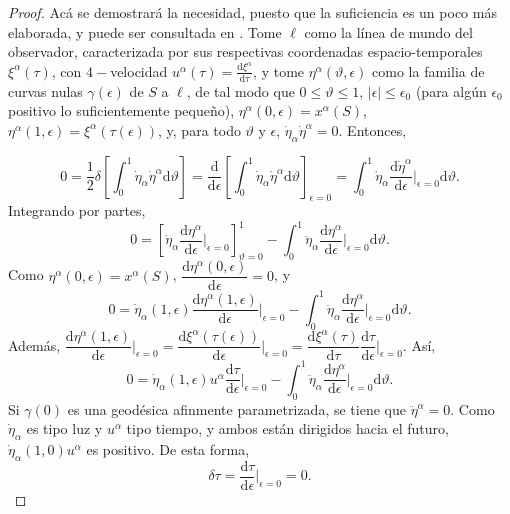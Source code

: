 \begin{proof}
Acá se demostrará la necesidad, puesto que la suficiencia es un poco más elaborada, y puede ser consultada en \cite{schneider_ehlers_falco_1992}. Tome $\ell$ como la línea de mundo del observador, caracterizada por sus respectivas coordenadas espacio-temporales $\xi^\alpha(\tau)$, con $4-$velocidad $u^\alpha(\tau)=\frac{\mathrm{d}\xi^\alpha}{\mathrm{d}\tau}$, y tome $\eta^\alpha(\vartheta,\epsilon)$ como la familia de curvas nulas $\gamma(\epsilon)$ de $S$ a $\ell$, de tal modo que $0\leq\vartheta\leq1$, $|\epsilon|\leq \epsilon_0$ (para algún $\epsilon_0$ positivo lo suficientemente pequeño), $\eta^\alpha(0,\epsilon)=x^\alpha(S)$, $\eta^\alpha(1,\epsilon)=\xi^\alpha(\tau(\epsilon))$, y, para todo $\vartheta$ y $\epsilon$, $\dot{\eta}_\alpha\dot{\eta}^\alpha=0$. Entonces,

$$0=\frac{1}{2}\delta\left[ \int_0^1 \dot{\eta}_\alpha\dot{\eta}^\alpha \mathrm{d}\vartheta  \right]=\frac{\mathrm{d}}{\mathrm{d}\epsilon}\left[ \int_0^1 \dot{\eta}_\alpha\dot{\eta}^\alpha \mathrm{d}\vartheta  \right]_{\epsilon=0}=\int_0^1 \dot{\eta}_\alpha \frac{\mathrm{d}\dot{\eta}^\alpha}{\mathrm{d}\epsilon}\Big|_{\epsilon=0}\mathrm{d}\vartheta.$$
Integrando por partes,
$$0=\left[ \dot{\eta}_\alpha\frac{\mathrm{d}\eta^\alpha}{\mathrm{d}\epsilon}\Big|_{\epsilon=0} \right]_{\vartheta=0}^1 -\int_0^1\ddot{\eta}_\alpha \frac{\mathrm{d}\eta^\alpha}{\mathrm{d}\epsilon}\Big|_{\epsilon=0}\mathrm{d}\vartheta.$$
Como $\eta^\alpha(0,\epsilon)=x^\alpha(S)$, $\dfrac{\mathrm{d}\eta^\alpha(0,\epsilon)}{\mathrm{d}\epsilon}=0$, y
$$0=\dot{\eta}_\alpha(1,\epsilon)\frac{\mathrm{d}\eta^\alpha(1,\epsilon)}{\mathrm{d}\epsilon}\Big|_{\epsilon=0}-\int_0^1\ddot{\eta}_\alpha\frac{\mathrm{d}\eta^\alpha}{\mathrm{d}\epsilon}\Big|_{\epsilon=0}\mathrm{d}\vartheta.$$
Además, $\dfrac{\mathrm{d}\eta^\alpha(1,\epsilon)}{\mathrm{d}\epsilon}\Big|_{\epsilon=0}=\dfrac{\mathrm{d}\xi^\alpha(\tau(\epsilon))}{\mathrm{d}\epsilon}\Big|_{\epsilon=0}=\dfrac{\mathrm{d}\xi^\alpha(\tau)}{\mathrm{d}\tau}\dfrac{\mathrm{d}\tau}{\mathrm{d}\epsilon}\Big|_{\epsilon=0}.$ Así,
$$0=\dot{\eta}_\alpha(1,\epsilon) u^\alpha\frac{\mathrm{d}\tau}{\mathrm{d}\epsilon}\Big|_{\epsilon=0}-\int_0^1\ddot{\eta}_\alpha\frac{\mathrm{d}\eta^\alpha}{\mathrm{d}\epsilon}\Big|_{\epsilon=0}\mathrm{d}\vartheta.$$
Si $\gamma(0)$ es una geodésica afinmente parametrizada, se tiene que $\ddot{\eta}^\alpha=0$. Como $\dot{\eta}_\alpha$ es tipo luz y $u^\alpha$ tipo tiempo, y ambos están dirigidos hacia el futuro, $\dot{\eta}_\alpha(1,0)u^\alpha$ es positivo. De esta forma,
$$\delta\tau=\frac{\mathrm{d}\tau}{\mathrm{d}\epsilon}\Big|_{\epsilon=0}=0.$$
\end{proof}

